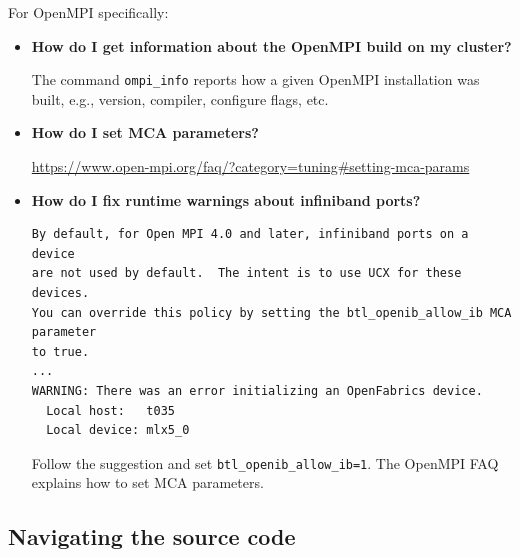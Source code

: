 \documentclass[10pt]{article}
\begin{document}
For OpenMPI specifically:
\begin{itemize}

    \item \textbf{How do I get information about the OpenMPI build on my cluster?}

        The command \texttt{ompi\_info} reports how a given OpenMPI
        installation was built, e.g., version, compiler, configure flags, etc.

    \item \textbf{How do I set MCA parameters?}

        \url{https://www.open-mpi.org/faq/?category=tuning#setting-mca-params}


    \item \textbf{How do I fix runtime warnings about infiniband ports?}

\begin{verbatim}
By default, for Open MPI 4.0 and later, infiniband ports on a device
are not used by default.  The intent is to use UCX for these devices.
You can override this policy by setting the btl_openib_allow_ib MCA parameter
to true.
...
WARNING: There was an error initializing an OpenFabrics device.
  Local host:   t035
  Local device: mlx5_0
\end{verbatim}

        Follow the suggestion and set \texttt{btl\_openib\_allow\_ib=1}.
        The OpenMPI FAQ explains how to set MCA parameters.

\end{itemize}

\subsection{Navigating the source code}
\end{document}
